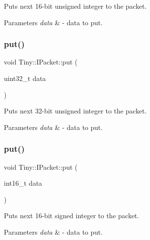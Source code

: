 Puts next 16-\/bit unsigned integer to the packet. 
\begin{DoxyParams}{Parameters}
{\em data} & -\/ data to put. \\
\hline
\end{DoxyParams}
\mbox{\label{classTiny_1_1IPacket_a5ec37c88a536d710fb1561cd62f52c91}} 
\subsubsection{\texorpdfstring{put()}{put()}\hspace{0.1cm}{\footnotesize\ttfamily [4/7]}}
{\footnotesize\ttfamily void Tiny\+::\+I\+Packet\+::put (\begin{DoxyParamCaption}\item[{uint32\+\_\+t}]{data }\end{DoxyParamCaption})\hspace{0.3cm}{\ttfamily [inline]}}

Puts next 32-\/bit unsigned integer to the packet. 
\begin{DoxyParams}{Parameters}
{\em data} & -\/ data to put. \\
\hline
\end{DoxyParams}
\mbox{\label{classTiny_1_1IPacket_abf21aef6652da2e975c8be13e6a643e9}} 
\subsubsection{\texorpdfstring{put()}{put()}\hspace{0.1cm}{\footnotesize\ttfamily [5/7]}}
{\footnotesize\ttfamily void Tiny\+::\+I\+Packet\+::put (\begin{DoxyParamCaption}\item[{int16\+\_\+t}]{data }\end{DoxyParamCaption})\hspace{0.3cm}{\ttfamily [inline]}}

Puts next 16-\/bit signed integer to the packet. 
\begin{DoxyParams}{Parameters}
{\em data} & -\/ data to put. \\
\hline
\end{DoxyParams}
\mbox{\label{classTiny_1_1IPacket_a46eaf3eb0232288dfb36ce7cc01b12e5}} 
